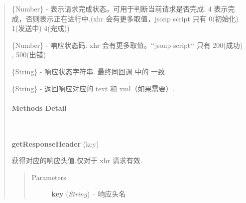 \documentclass[letterpaper,10pt,english]{sphinxmanual}
\begin{document}
\begin{quote}
\begin{fulllineitems}
\label{api/core/ajax/xhr:io.readyState}
\{Number\} - 表示请求完成状态。可用于判断当前请求是否完成. 4 表示完成，否则表示正在进行中.(xhr 会有更多取值，jsonp script 只有 0(初始化) 1(发送中) 4(完成))

\end{fulllineitems}



\begin{fulllineitems}
\label{api/core/ajax/xhr:io.status}
\{Number\} - 响应状态码. xhr 会有更多取值。{}`{}`jsonp script{}`{}` 只有 200(成功) , 500(出错)

\end{fulllineitems}



\begin{fulllineitems}
\label{api/core/ajax/xhr:io.statusText}
\{String\} - 响应状态字符串. 最终同回调 {\hyperref[api/core/ajax/io:io.cfg.complete]{}} 中的  一致.

\end{fulllineitems}



\begin{fulllineitems}
\label{api/core/ajax/xhr:io.responseText}
\{String\} - 返回响应对应的 text 和 xml（如果需要）.

\end{fulllineitems}



\paragraph{Methods Detail}
\label{api/core/ajax/xhr:methods-detail}

\begin{fulllineitems}
\label{api/core/ajax/xhr:io.getResponseHeader}~
\begin{DUlineblock}{0em}
\item[] \textbf{getResponseHeader} (key)
\item[] 获得对应的响应头值.仅对于 xhr 请求有效.
\end{DUlineblock}
\begin{quote}\begin{description}
\item[{Parameters}] \leavevmode
\textbf{key} (\emph{String}) -- 响应头名


\end{description}
\end{quote}
\end{fulllineitems}
\end{quote}
\end{document}
